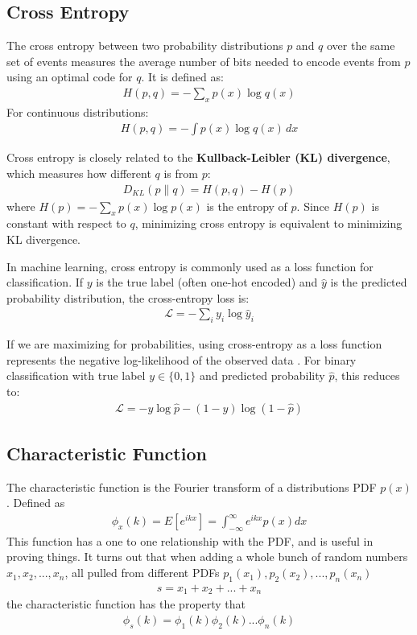 \subsection{Cross Entropy}
The cross entropy between two probability distributions $p$ and $q$ over the same set of events measures the average number of bits needed to encode events from $p$ using an optimal code for $q$. It is defined as:
\begin{align}
	H(p, q) = -\sum_x p(x) \log q(x)
\end{align}
For continuous distributions:
\begin{align}
	H(p, q) = -\int p(x) \log q(x) \, dx
\end{align}

Cross entropy is closely related to the \textbf{Kullback-Leibler (KL) divergence}, which measures how different $q$ is from $p$:
\begin{align}
	D_{KL}(p \| q) = H(p, q) - H(p)
\end{align}
where $H(p) = -\sum_x p(x) \log p(x)$ is the entropy of $p$. Since $H(p)$ is constant with respect to $q$, minimizing cross entropy is equivalent to minimizing KL divergence.

In machine learning, cross entropy is commonly used as a loss function for classification. If $y$ is the true label (often one-hot encoded) and $\hat{y}$ is the predicted probability distribution, the cross-entropy loss is:
\begin{align}
	\mathcal{L} = -\sum_i y_i \log \hat{y}_i
\end{align}

If we are maximizing for probabilities, using cross-entropy as a loss function represents the negative log-likelihood of the observed data \cite{grus}. For binary classification with true label $y \in \{0, 1\}$ and predicted probability $\hat{p}$, this reduces to:
\begin{align}
	\mathcal{L} = -y \log \hat{p} - (1 - y) \log(1 - \hat{p})
\end{align}

\subsection{Characteristic Function}
The characteristic function is the Fourier transform of a distributions PDF $p(x)$. Defined as 
\begin{align}
\phi_x(k) = E[e^{ikx}] = \int_{-\infty}^\infty e^{ikx}p(x)dx
\end{align}
This function has a one to one relationship with the PDF, and is useful in proving things. It turns out that when adding a whole bunch of random numbers $x_1, x_2, ..., x_n$, all pulled from different PDFs $p_1(x_1), p_2(x_2), ..., p_n(x_n)$
\begin{align}
s = x_1 + x_2 + ... + x_n
\end{align}
the characteristic function has the property that
\begin{align}
\phi_s(k) =\phi_1(k)\phi_2(k)...\phi_n(k)
\end{align}


